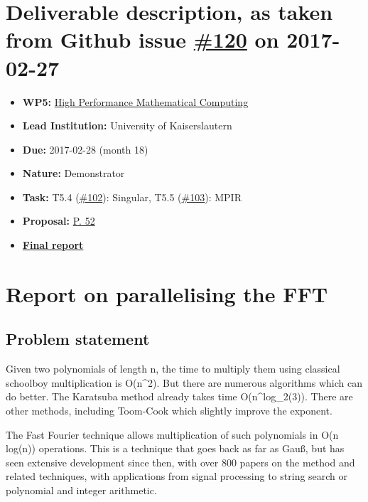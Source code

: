 \section*{\texorpdfstring{Deliverable description, as taken from Github
issue
\href{https://github.com/OpenDreamKit/OpenDreamKit/issues/120}{\#120} on
2017-02-27}{Deliverable description, as taken from Github issue \#120 on 2017-02-27}}\label{deliverable-description-as-taken-from-github-issue-120-on-2017-02-27}

\begin{itemize}
\tightlist
\item
  \textbf{WP5:}
  \href{https://github.com/OpenDreamKit/OpenDreamKit/tree/master/WP5}{High
  Performance Mathematical Computing}
\item
  \textbf{Lead Institution:} University of Kaiserslautern
\item
  \textbf{Due:} 2017-02-28 (month 18)
\item
  \textbf{Nature:} Demonstrator
\item
  \textbf{Task:} T5.4
  (\href{https://github.com/OpenDreamKit/OpenDreamKit/issues/102}{\#102}):
  Singular, T5.5
  (\href{https://github.com/OpenDreamKit/OpenDreamKit/issues/103}{\#103}):
  MPIR
\item
  \textbf{Proposal:}
  \href{https://github.com/OpenDreamKit/OpenDreamKit/raw/master/Proposal/proposal-www.pdf}{P.
  52}
\item
  \textbf{\href{https://github.com/OpenDreamKit/OpenDreamKit/raw/master/WP5/D5.7/report-final.pdf}{Final
  report}}
\end{itemize}

\section*{Report on parallelising the
FFT}\label{report-on-parallelising-the-fft}

\subsection{Problem statement}\label{problem-statement}

Given two polynomials of length n, the time to multiply them using
classical schoolboy multiplication is O(n\^{}2). But there are numerous
algorithms which can do better. The Karatsuba method already takes time
O(n\^{}log\_2(3)). There are other methods, including Toom-Cook which
slightly improve the exponent.

The Fast Fourier technique allows multiplication of such polynomials in
O(n log(n)) operations. This is a technique that goes back as far as
Gauß, but has seen extensive development since then, with over 800
papers on the method and related techniques, with applications from
signal processing to string search or polynomial and integer arithmetic.

